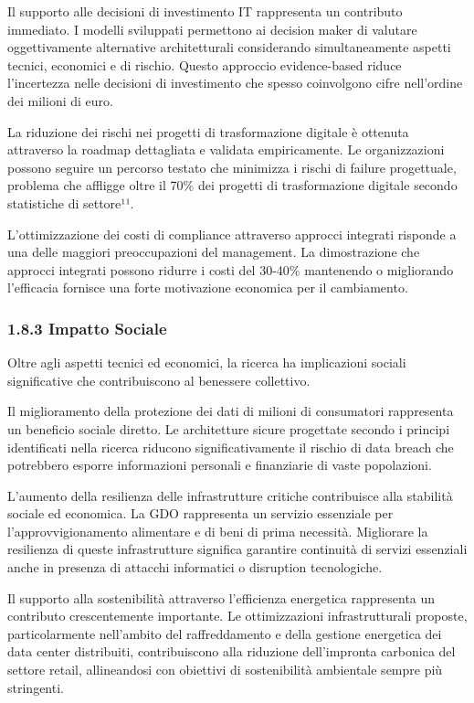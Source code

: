 \documentclass[12pt,a4paper,oneside]{book}
\begin{document}
Il supporto alle decisioni di investimento IT rappresenta un contributo
immediato. I modelli sviluppati permettono ai decision maker di valutare
oggettivamente alternative architetturali considerando simultaneamente
aspetti tecnici, economici e di rischio. Questo approccio evidence-based
riduce l'incertezza nelle decisioni di investimento che spesso
coinvolgono cifre nell'ordine dei milioni di euro.

La riduzione dei rischi nei progetti di trasformazione digitale è
ottenuta attraverso la roadmap dettagliata e validata empiricamente. Le
organizzazioni possono seguire un percorso testato che minimizza i
rischi di failure progettuale, problema che affligge oltre il 70\% dei
progetti di trasformazione digitale secondo statistiche di settore¹¹.

L'ottimizzazione dei costi di compliance attraverso approcci integrati
risponde a una delle maggiori preoccupazioni del management. La
dimostrazione che approcci integrati possono ridurre i costi del 30-40\%
mantenendo o migliorando l'efficacia fornisce una forte motivazione
economica per il cambiamento.

\subsubsection{\texorpdfstring{\textbf{1.8.3 Impatto
Sociale}}{1.8.3 Impatto Sociale}}\label{impatto-sociale}

Oltre agli aspetti tecnici ed economici, la ricerca ha implicazioni
sociali significative che contribuiscono al benessere collettivo.

Il miglioramento della protezione dei dati di milioni di consumatori
rappresenta un beneficio sociale diretto. Le architetture sicure
progettate secondo i principi identificati nella ricerca riducono
significativamente il rischio di data breach che potrebbero esporre
informazioni personali e finanziarie di vaste popolazioni.

L'aumento della resilienza delle infrastrutture critiche contribuisce
alla stabilità sociale ed economica. La GDO rappresenta un servizio
essenziale per l'approvvigionamento alimentare e di beni di prima
necessità. Migliorare la resilienza di queste infrastrutture significa
garantire continuità di servizi essenziali anche in presenza di attacchi
informatici o disruption tecnologiche.

Il supporto alla sostenibilità attraverso l'efficienza energetica
rappresenta un contributo crescentemente importante. Le ottimizzazioni
infrastrutturali proposte, particolarmente nell'ambito del
raffreddamento e della gestione energetica dei data center distribuiti,
contribuiscono alla riduzione dell'impronta carbonica del settore
retail, allineandosi con obiettivi di sostenibilità ambientale sempre
più stringenti.
\end{document}
